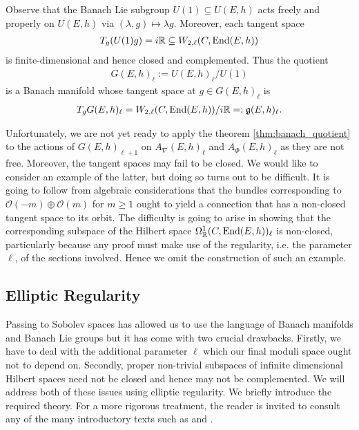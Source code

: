\documentclass[12pt]{ociamthesis}  %
\begin{document}
\begin{example}
  Observe that the Banach Lie subgroup $U(1)\subseteq U(E,h)$ acts freely and properly
  on $U(E,h)$ via $(\lambda,g)\mapsto \lambda g$. Moreover, each tangent space
  \begin{align*}
    T_g(U(1)g) =
    i\mathbb{R} \subseteq W_{2,\ell}(C,\operatorname{End}(E,h))
  \end{align*}
  is finite-dimensional and hence closed and complemented.  Thus the quotient
  \begin{align*}
    G(E,h)_{\ell} := U(E,h)_\ell / U(1)
  \end{align*}
  is a Banach manifold whose tangent space at $g\in G(E,h)_\ell$ is
  \begin{align*}
    T_g G(E,h)_\ell =  W_{2,\ell}(C,\operatorname{End}(E,h))/i\mathbb{R} =: \mathfrak g(E,h)_\ell.
  \end{align*}
\end{example}

Unfortunately, we are not yet ready to apply the theorem \ref{thm:banach_quotient} to
the actions of $G(E,h)_{\ell+1}$ on $A_\nabla(E,h)_\ell$ and
$A_\Phi(E,h)_\ell$ as they are not free. Moreover, the tangent spaces
may fail to be closed. We would like to consider an example of the latter,
but doing so turns out to be difficult. It is going to follow from algebraic
considerations that the bundles corresponding to $\mathscr O(-m)\oplus\mathscr O(m)$ for $m\geq 1$ ought
to yield a connection that has a non-closed tangent space to its orbit.
The difficulty is going to arise in showing that the corresponding subspace
of the Hilbert space $\Omega^1_{\mathbb R}(C,\operatorname{End}(E,h))_\ell$ is non-closed,
particularly because any proof must make use of the regularity, i.e.
the parameter $\ell$, of the sections involved. Hence we omit the construction
of such an example.

\subsection{Elliptic Regularity}\label{sec:elliptic_regularity}

Passing to Sobolev spaces has allowed us to use the language of
Banach manifolds and Banach Lie groups but it has come with two
crucial drawbacks. Firstly, we have to deal with the additional
parameter $\ell$ which our final moduli space ought not to depend on.
Secondly, proper non-trivial subspaces of infinite dimensional Hilbert
spaces need not be closed and hence may not be complemented.
We will address both of these issues using elliptic regularity.
We briefly introduce the required theory.
For a more rigorous treatment, the reader is invited to consult
any of the many introductory texts such as \cite{hance2014} and
\cite[Chapter 6]{warner1983}.
\end{document}
